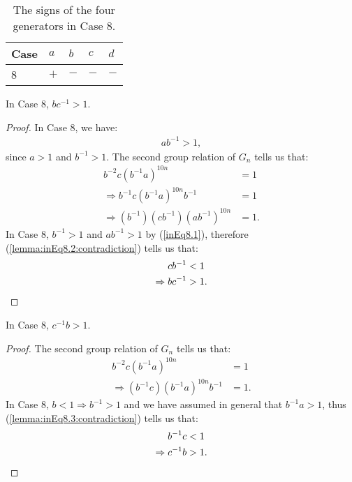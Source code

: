 \begin{table}[ht]
\begin{center}
\begin{tabular}{l | l | l | l | l}
Case\hspace{10 pt} & $a$\hspace{10 pt} & $b$\hspace{10 pt} & $c$\hspace{10 pt} & $d$\hspace{10 pt} \\\hline\hline
8 & $+$ & $-$ & $-$ & $-$ \\
\end{tabular}
\end{center}
\caption{The signs of the four generators in Case 8.}
\label{table:case8}
\end{table}

\begin{lemma} In Case 8, $bc^{-1}>1$.
\label{lemma:inEq8.2}
\end{lemma}
\begin{proof} In Case 8, we have:
\begin{align}
ab^{-1}>1,\label{inEq8.1}
\end{align} 
since $a>1$ and $b^{-1}>1$. The second group relation of $G_n$ tells us that:
\begin{align}
b^{-2}c(b^{-1}a)^{10n}&=1\nonumber{}\\
\Rightarrow{}b^{-1}c(b^{-1}a)^{10n}b^{-1}&=1\nonumber{}\\
\Rightarrow{}(b^{-1})(cb^{-1})(ab^{-1})^{10n}&=1.\label{lemma:inEq8.2:contradiction}
\end{align}
In Case 8, $b^{-1}>1$ and $ab^{-1}>1$ by (\ref{inEq8.1}), therefore (\ref{lemma:inEq8.2:contradiction}) tells us that:
\begin{align*}
cb^{-1}&<1\\
\Rightarrow{}bc^{-1}&>1.\qedhere
\end{align*}
\end{proof}

\begin{lemma} In Case 8, $c^{-1}b>1$.
\label{lemma:inEq8.3}
\end{lemma}
\begin{proof} The second group relation of $G_n$ tells us that:
\begin{align}
b^{-2}c(b^{-1}a)^{10n}&=1\nonumber{}\\
\Rightarrow{}(b^{-1}c)(b^{-1}a)^{10n}b^{-1}&=1.\label{lemma:inEq8.3:contradiction}
\end{align}
In Case 8, $b<1\Rightarrow{}b^{-1}>1$ and we have assumed in general that $b^{-1}a>1$, thus (\ref{lemma:inEq8.3:contradiction}) tells us that:
\begin{align*}
b^{-1}c&<1\\
\Rightarrow{}c^{-1}b&>1.\qedhere
\end{align*}
\end{proof}

